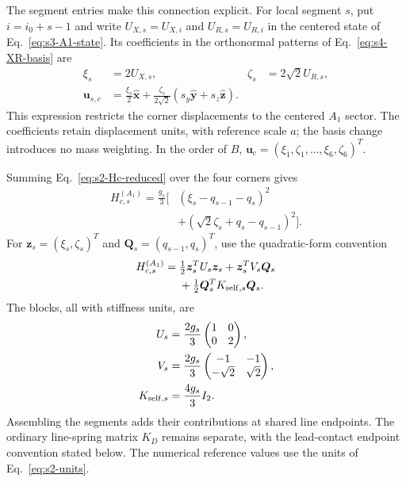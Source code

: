 \documentclass[10pt,aps,pre,reprint,floatfix,notitlepage,nofootinbib]{revtex4-2}
\newcommand{\vu}{\bm{u}}
\newcommand{\ex}{\hat{\bm{x}}}
\newcommand{\ey}{\hat{\bm{y}}}
\newcommand{\ez}{\hat{\bm{z}}}
\begin{document}
The segment entries make this connection explicit. For local segment $s$, put $i=i_0+s-1$ and write $U_{X,s}=U_{X,i}$ and $U_{R,s}=U_{R,i}$ in the centered state of Eq.~\eqref{eq:s3-A1-state}. Its coefficients in the orthonormal patterns of Eq.~\eqref{eq:s4-XR-basis} are
\begin{align}
 \xi_s&=2U_{X,s}, & \zeta_s&=2\sqrt2 U_{R,s},\nonumber\\
 \vu_{s,c}&=\frac{\xi_s}{2}\ex
 +\frac{\zeta_s}{2\sqrt2}(s_y\ey+s_z\ez).
 \label{eq:s5-segment-coordinates}
\end{align}
This expression restricts the corner displacements to the centered $A_1$ sector. The coefficients retain displacement units, with reference scale $a$; the basis change introduces no mass weighting. In the order of $B$, $\vu_c=(\xi_1,\zeta_1,\ldots,\xi_6,\zeta_6)^T$.

Summing Eq.~\eqref{eq:s2-Hc-reduced} over the four corners gives
\begin{align}
 H_{c,s}^{(A_1)}=\frac{g_s}{3}\big[&
 (\xi_s-q_{s-1}-q_s)^2\nonumber\\[-2pt]
 &+(\sqrt2\zeta_s+q_s-q_{s-1})^2\big].
 \label{eq:s5-segment-energy}
\end{align}
For $\bm z_s=(\xi_s,\zeta_s)^T$ and $\bm Q_s=(q_{s-1},q_s)^T$, use the quadratic-form convention
\begin{align}
 H_{c,s}^{(A_1)}={}&\tfrac12\bm z_s^TU_s\bm z_s
 +\bm z_s^TV_s\bm Q_s\nonumber\\
 &+\tfrac12\bm Q_s^TK_{{\rm self},s}\bm Q_s.
 \label{eq:s5-segment-quadratic}
\end{align}
The blocks, all with stiffness units, are
\begin{align}
 U_s&=\frac{2g_s}{3}
 \begin{pmatrix}1&0\\0&2\end{pmatrix},\nonumber\\
 V_s&=\frac{2g_s}{3}
 \begin{pmatrix}-1&-1\\-\sqrt2&\sqrt2\end{pmatrix},\nonumber\\
 K_{{\rm self},s}&=\frac{4g_s}{3}I_2.
 \label{eq:s5-segment-hessian}
\end{align}
Assembling the segments adds their contributions at shared line endpoints. The ordinary line-spring matrix $K_D$ remains separate, with the lead-contact endpoint convention stated below. The numerical reference values use the units of Eq.~\eqref{eq:s2-units}.
\end{document}
